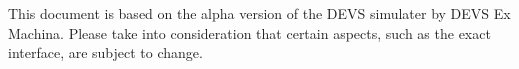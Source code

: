 This document is based on the alpha version of the DEVS simulater by DEVS Ex Machina. Please take into consideration that certain aspects, such as the exact interface, are subject to change.